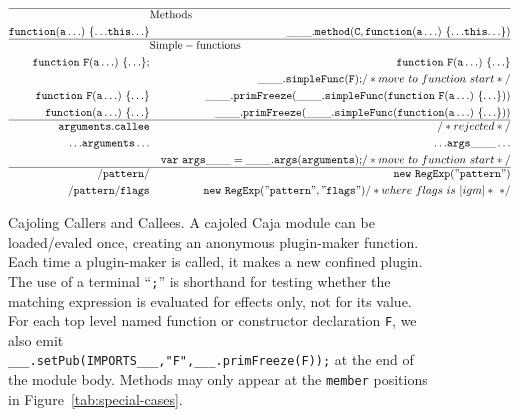 \documentclass[letterpaper,twocolumn,10pt]{article}
\newcommand{\code}[1]{{\tt {#1}}}              %
\begin{document}
\begin{figure}
\begin{eqnarray}
  \hline
   \nonumber & \lefteqn{\mathrm{Methods}} & \\
  \code{function(a\ldots)\ \{{\ldots}this{\ldots}\}}         
             & \label{member:method}  & \code{\_\_\_.method(C,function(a\ldots)\ \{{\ldots}this{\ldots}\})} \\
  \hline
   \nonumber & \lefteqn{\mathrm{Simple-functions}} & \\
  \code{function\ F(a\ldots)\ \{{\ldots}\};} 
             & \label{func:named-decl} & \code{function\ F(a\ldots)\ \{{\ldots}\}} \\
             & \nonumber               & \code{\_\_\_.simpleFunc(F);} /*move\ to\ function\ start*/ \\
  \code{function\ F(a\ldots)\ \{{\ldots}\}}      
             & \label{func:named-expr}
                                 & \code{\_\_\_.primFreeze(\_\_\_.simpleFunc(function\ F(a\ldots)\ \{{\ldots}\}))} \\
  \code{function(a\ldots)\ \{{\ldots}\}}         
             & \label{func:anon} & \code{\_\_\_.primFreeze(\_\_\_.simpleFunc(function(a\ldots)\ \{{\ldots}\}))} \\ 
  \hline
  \code{arguments.callee} 
             & \label{read:bad-callee} & /*rejected*/ \\
  \code{{\ldots}arguments\ldots} 
             & \label{read:args}   & \code{{\ldots}args\_\_\_\ldots} \\
             & \nonumber           & \code{var\ args\_\_\_ = \_\_\_.args(arguments);} /*move\ to\ function\ start*/\\ 
  \hline
  \code{/pattern/}      & \label{pattern:unary}                 & \code{new\ RegExp("pattern")} \\
  \code{/pattern/flags} & \label{pattern:binary}
                                   & \code{new\ RegExp("pattern", "flags")} /*where\ flags\ is\ [igm]*\ */
\end{eqnarray}

\caption[Cajoling Callers and Callees]{Cajoling Callers and Callees. A 
cajoled Caja module can be loaded/evaled once, creating an anonymous 
plugin-maker function. Each time a plugin-maker is called, it makes a new 
confined plugin. The use of a terminal ``\code{;}'' is shorthand for testing 
whether the matching expression is evaluated for effects only, not for its 
value. For each top level named function or constructor declaration \code{F}, we 
also emit \\
\code{\_\_\_.setPub(IMPORTS\_\_\_,"F",\_\_\_.primFreeze(F));} at the end of the 
module body. Methods may only appear at the \code{member} positions in 
Figure~\ref{tab:special-cases}.}
\label{tab:call-xlate}
\end{figure}
\end{document}

